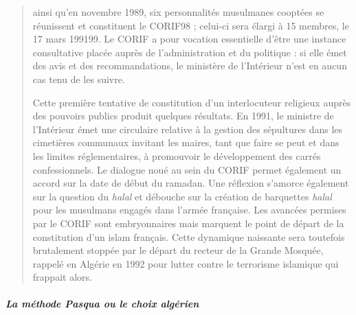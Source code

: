 \begin{quote}
ainsi qu'en novembre 1989, six personnalités musulmanes cooptées se
réunissent et constituent le CORIF98 ; celui-ci sera élargi à 15
membres, le 17 mars 199199. Le CORIF a pour vocation essentielle d'être
une instance consultative placée auprès de l'administration et du
politique : si elle émet des avis et des recommandations, le ministère
de l'Intérieur n'est en aucun cas tenu de les suivre.

Cette première tentative de constitution d'un interlocuteur religieux
auprès des pouvoirs publics produit quelques résultats. En 1991, le
ministre de l'Intérieur émet une circulaire relative à la gestion des
sépultures dans les cimetières communaux invitant les maires, tant que
faire se peut et dans les limites réglementaires, à promouvoir le
développement des carrés confessionnels. Le dialogue noué au sein du
CORIF permet également un accord sur la date de début du ramadan. Une
réflexion s'amorce également sur la question du \emph{halal} et débouche
sur la création de barquettes \emph{halal} pour les musulmans engagés
dans l'armée française. Les avancées permises par le CORIF sont
embryonnaires mais marquent le point de départ de la constitution d'un
islam français. Cette dynamique naissante sera toutefois brutalement
stoppée par le départ du recteur de la Grande Mosquée, rappelé en
Algérie en 1992 pour lutter contre le terrorisme islamique qui frappait
alors.
\end{quote}

\hypertarget{la-muxe9thode-pasqua-ou-le-choix-alguxe9rien}{%
\subparagraph{La méthode Pasqua ou le choix
algérien}\label{la-muxe9thode-pasqua-ou-le-choix-alguxe9rien}}

